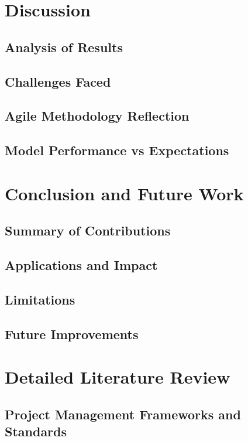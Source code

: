 \documentclass{report}
\begin{document}
\chapter{Discussion}  %
\section{Analysis of Results}
\section{Challenges Faced}
\section{Agile Methodology Reflection}
\section{Model Performance vs Expectations}

\chapter{Conclusion and Future Work}  %
\section{Summary of Contributions}
\section{Applications and Impact}
\section{Limitations}
\section{Future Improvements}


\printbibliography%

\appendix
\chapter{Detailed Literature Review}
\section{Project Management Frameworks and Standards}
\end{document}
